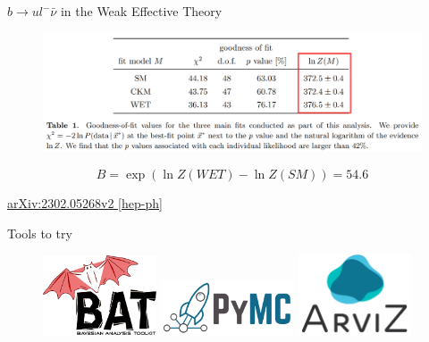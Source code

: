 \documentclass[
aspectratio=169,
14pt,
professionalfonts
]{beamer}
\begin{document}
\begin{frame}{$b\to u l^- \bar \nu$ in the Weak Effective Theory}
    \begin{figure}
        \centering
        \includegraphics[width=\textwidth]{../plots/wet-bayes.png}
    \end{figure}
    $$
    B = \exp(\ln Z(WET) - \ln Z (SM)) = 54.6
    $$
    \begin{flushright}
        \small
        \href{https://arxiv.org/pdf/2302.05268}{arXiv:2302.05268v2 [hep-ph]}
    \end{flushright}
\end{frame}

\begin{frame}{Tools to try}
\begin{figure}
    \center
    \href{
        https://github.com/bat
    }{\includegraphics[width=0.3\textwidth]{../plots/bat.pdf}}
    \hfill
    \href{
        https://www.pymc.io/
    }{\includegraphics[width=0.35\textwidth]{../plots/pymc.png}}
    \hfill
    \href{
        https://python.arviz.org/en/stable/
    }{\includegraphics[width=0.3\textwidth]{../plots/arviz.png}}
\end{figure}
\end{frame}
\end{document}
